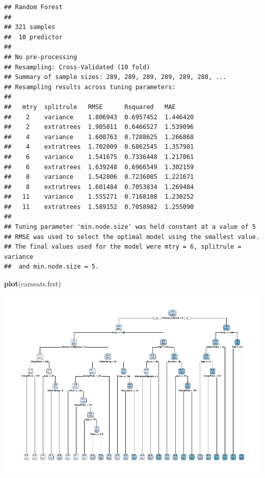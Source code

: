 \documentclass[
]{book}
\newenvironment{Shaded}{\begin{snugshade}}{\end{snugshade}}
\newcommand{\DataTypeTok}[1]{\textcolor[rgb]{0.13,0.29,0.53}{#1}}
\newcommand{\DecValTok}[1]{\textcolor[rgb]{0.00,0.00,0.81}{#1}}
\newcommand{\KeywordTok}[1]{\textcolor[rgb]{0.13,0.29,0.53}{\textbf{#1}}}
\newcommand{\NormalTok}[1]{#1}
\newcommand{\OperatorTok}[1]{\textcolor[rgb]{0.81,0.36,0.00}{\textbf{#1}}}
\newcommand{\StringTok}[1]{\textcolor[rgb]{0.31,0.60,0.02}{#1}}
\begin{document}
\begin{verbatim}
## Random Forest 
## 
## 321 samples
##  10 predictor
## 
## No pre-processing
## Resampling: Cross-Validated (10 fold) 
## Summary of sample sizes: 289, 289, 289, 289, 289, 288, ... 
## Resampling results across tuning parameters:
## 
##   mtry  splitrule   RMSE      Rsquared   MAE     
##    2    variance    1.806943  0.6957452  1.446420
##    2    extratrees  1.905011  0.6466527  1.539096
##    4    variance    1.600763  0.7288625  1.266868
##    4    extratrees  1.702009  0.6862545  1.357981
##    6    variance    1.541675  0.7336448  1.217061
##    6    extratrees  1.639248  0.6966549  1.302159
##    8    variance    1.542806  0.7236085  1.221671
##    8    extratrees  1.601484  0.7053834  1.269484
##   11    variance    1.555271  0.7168108  1.230252
##   11    extratrees  1.589152  0.7058982  1.255090
## 
## Tuning parameter 'min.node.size' was held constant at a value of 5
## RMSE was used to select the optimal model using the smallest value.
## The final values used for the model were mtry = 6, splitrule = variance
##  and min.node.size = 5.
\end{verbatim}

\begin{Shaded}
\begin{Highlighting}[]
\KeywordTok{plot}\NormalTok{(carseats.frst)}
\end{Highlighting}
\end{Shaded}

\includegraphics{data-sci_files/figure-latex/unnamed-chunk-109-1.pdf}

\begin{Shaded}
\end{Shaded}
\end{document}
